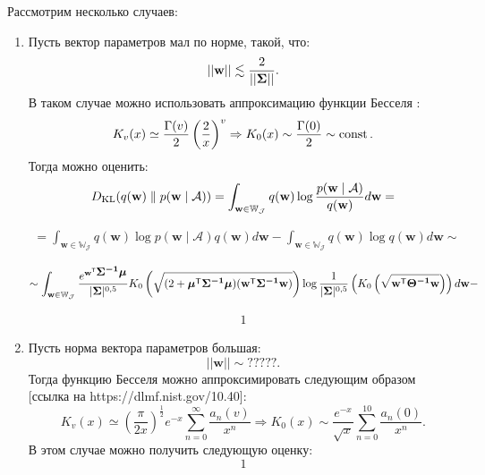 Рассмотрим несколько случаев:
\begin{enumerate}
\item Пусть вектор параметров мал по норме, такой, что:
\begin{equation} \label{methods.3}
||\mathbf{w}|| \lesssim \frac{2}{||\mbox{\boldmath$\Sigma$}||}.
\end{equation}
В таком случае можно использовать аппроксимацию функции Бесселя \cite{Temme1975}:
\begin{equation} \label{methods.4}
K_v(x) \simeq \frac{\Gamma(v)}{2} \left( \frac{2}{x} \right)^v \Rightarrow K_0(x) \sim \frac{\Gamma(0)}{2} \sim \operatorname{const}.
\end{equation}
Тогда можно оценить:
\[
\label{methods.5}
\begin{aligned}
D_{\operatorname{KL}}(q(\mathbf{w}) \parallel p(\mathbf{w} \mid \mathcal{A})) = \int_{\mathbf{w \in \mathbb{W}_{\mathcal{J}}}} q(\mathbf{w}) \log \frac{p(\mathbf{w} \mid \mathcal{A})}{q(\mathbf{w})} d \mathbf{w} = 
\end{aligned}
\]

\[
\begin{aligned}
= \int_{\mathbf{w \in \mathbb{W}_{\mathcal{J}}}} q(\mathbf{w}) \log p(\mathbf{w} \mid \mathcal{A}) q(\mathbf{w}) d \mathbf{w} - \int_{\mathbf{w \in \mathbb{W}_{\mathcal{J}}}} q(\mathbf{w}) \log q(\mathbf{w}) d \mathbf{w} \sim
\end{aligned}
\]

\[
\begin{aligned}
\sim \int_{\mathbf{w \in \mathbb{W}_{\mathcal{J}}}} \frac{e^{\mathbf{w}^{\mathsf{T}}\mbox{\boldmath$\Sigma^{-1}$}\mbox{\boldmath$\mu$}}}{|\mbox{\boldmath$\Sigma$}|^{0,5}} K_0 \left( \sqrt{(2 + \mbox{\boldmath$\mu$}^{\mathsf{T}}\mbox{\boldmath$\Sigma^{-1}$}\mbox{\boldmath$\mu$})(\mathbf{w}^{\mathsf{T}}\mbox{\boldmath$\Sigma^{-1}$}\mathbf{w})} \right) \log \frac{1}{|\mbox{\boldmath$\Sigma$}|^{0,5}} \left(  K_0 \left( \sqrt{\mathbf{w}^{\mathsf{T}}\mbox{\boldmath$\Theta^{-1}$}\mathbf{w}} \right) \right) d \mathbf{w} -
\end{aligned}
\]

\[
\begin{aligned}
1
\end{aligned}
\]

\item Пусть норма вектора параметров большая:
\begin{equation} \label{methods.3}
||\mathbf{w}|| \sim ?????.
\end{equation}
Тогда функцию Бесселя можно аппроксимировать следующим образом [ссылка на https://dlmf.nist.gov/10.40]:
\begin{equation} \label{methods.3}
K_v(x) \simeq \left( \frac{\pi}{2x}\right)^{\frac{1}{2}}e^{-x} \sum \limits_{n=0}^{\infty} \frac{a_n(v)}{x^n} \Rightarrow K_0(x) \sim \frac{e^{-x}}{\sqrt{x}} \sum \limits_{n=0}^{10} \frac{a_n(0)}{x^n}.
\end{equation}
В этом случае можно получить следующую оценку:
\[1\] 
\end{enumerate}


